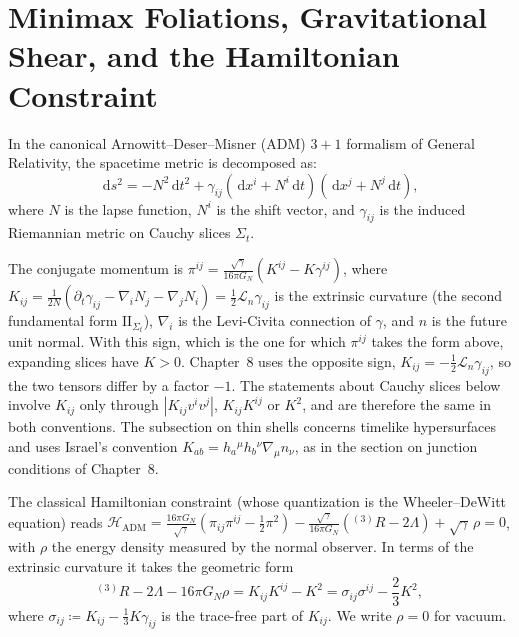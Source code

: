 \documentclass[11pt,a4paper,reqno]{amsart}
\theoremstyle{definition}
\numberwithin{equation}{section}
\providecommand{\II}{\mathrm{I\!I}}
\newcommand{\dif}{\,\mathrm{d}}
\providecommand{\II}{\mathrm{II}}
\begin{document}
\section{Minimax Foliations, Gravitational Shear, and the Hamiltonian Constraint}
\label{sec:minimax_adm}

In the canonical Arnowitt--Deser--Misner (ADM) $3+1$ formalism of General Relativity, the spacetime metric is decomposed as:
\begin{equation}
    \label{eq:adm_metric}
    \dif s^2 = -N^2 \dif t^2 + \gamma_{ij}(\dif x^i + N^i \dif t)(\dif x^j + N^j \dif t),
\end{equation}
where $N$ is the lapse function, $N^i$ is the shift vector, and $\gamma_{ij}$ is the induced Riemannian metric on Cauchy slices $\Sigma_t$.

The conjugate momentum is $\pi^{ij} = \frac{\sqrt{\gamma}}{16\pi G_N}(K^{ij} - K \gamma^{ij})$, where $K_{ij} = \frac{1}{2N}(\partial_t \gamma_{ij} - \nabla_i N_j - \nabla_j N_i) = \frac12 \mathcal{L}_n \gamma_{ij}$ is the extrinsic curvature (the second fundamental form $\II_{\Sigma_t}$), $\nabla_i$ is the Levi-Civita connection of $\gamma$, and $n$ is the future unit normal. With this sign, which is the one for which $\pi^{ij}$ takes the form above, expanding slices have $K > 0$. Chapter~8 \cite{silvafilho2026noneuclidean} uses the opposite sign, $K_{ij} = -\frac12\mathcal{L}_n\gamma_{ij}$, so the two tensors differ by a factor $-1$. The statements about Cauchy slices below involve $K_{ij}$ only through $|K_{ij}v^iv^j|$, $K_{ij}K^{ij}$ or $K^2$, and are therefore the same in both conventions. The subsection on thin shells concerns timelike hypersurfaces and uses Israel's convention $K_{ab} = h_a{}^\mu h_b{}^\nu \nabla_\mu n_\nu$, as in the section on junction conditions of Chapter~8.

The classical Hamiltonian constraint (whose quantization is the Wheeler--DeWitt equation) reads $\mathcal{H}_{\mathrm{ADM}} = \frac{16\pi G_N}{\sqrt{\gamma}}\left( \pi_{ij}\pi^{ij} - \frac{1}{2}\pi^2 \right) - \frac{\sqrt{\gamma}}{16\pi G_N}\left( {}^{(3)}R - 2\Lambda \right) + \sqrt{\gamma}\,\rho = 0$, with $\rho$ the energy density measured by the normal observer. In terms of the extrinsic curvature it takes the geometric form
\begin{equation}
    \label{eq:wdw_hamiltonian}
    {}^{(3)}R - 2\Lambda - 16\pi G_N \rho = K_{ij} K^{ij} - K^2 = \sigma_{ij}\sigma^{ij} - \frac{2}{3}K^2,
\end{equation}
where $\sigma_{ij} \coloneqq K_{ij} - \frac{1}{3} K \gamma_{ij}$ is the trace-free part of $K_{ij}$. We write $\rho = 0$ for vacuum.
\end{document}
